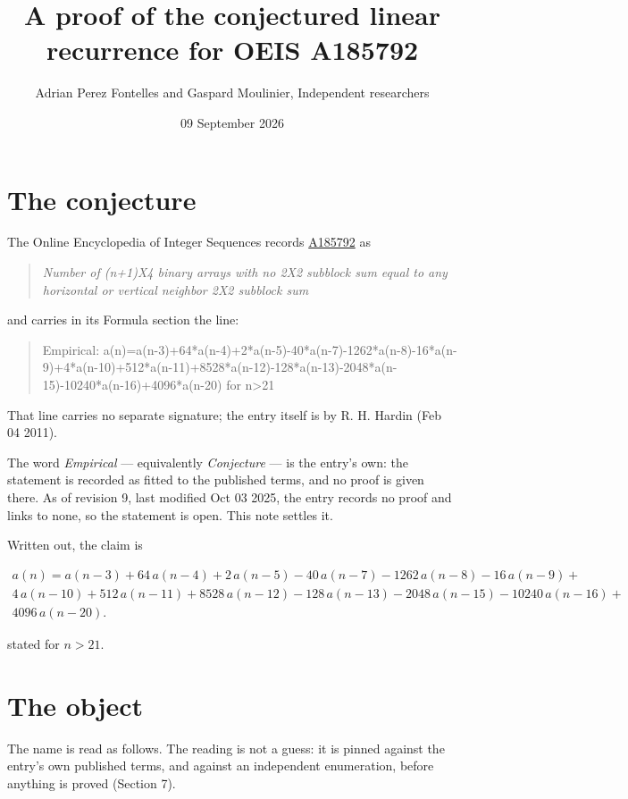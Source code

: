 \documentclass[11pt]{article}
\title{A proof of the conjectured linear recurrence for OEIS A185792}
\author{Adrian Perez Fontelles and Gaspard Moulinier, Independent researchers}
\date{09 September 2026}
\theoremstyle{definition}
\begin{document}
\maketitle
\section{The conjecture}

The Online Encyclopedia of Integer Sequences records \href{https://oeis.org/A185792}{A185792} as

\begin{quote}\itshape Number of (n+1)X4 binary arrays with no 2X2 subblock sum equal to any horizontal or vertical neighbor 2X2 subblock sum\end{quote}

and carries in its Formula section the line:

\begin{quote}\ttfamily Empirical: a(n)=a(n-3)+64*a(n-4)+2*a(n-5)-40*a(n-7)-1262*a(n-8)-16*a(n-9)+4*a(n-10)+512*a(n-11)+8528*a(n-12)-128*a(n-13)-2048*a(n-15)-10240*a(n-16)+4096*a(n-20) for n>21\end{quote}

That line carries no separate signature; the entry itself is by R. H. Hardin (Feb 04 2011).

The word {\itshape Empirical} --- equivalently {\itshape Conjecture} --- is the entry's own: the statement is recorded as fitted to the published terms, and no proof is given there. As of revision 9, last modified Oct 03 2025, the entry records no proof and links to none, so the statement is open. This note settles it.

Written out, the claim is

\begin{multline*} a(n) = a(n-3) + 64\,a(n-4) + 2\,a(n-5) - 40\,a(n-7) - 1262\,a(n-8) - 16\,a(n-9) + \\ 4\,a(n-10) + 512\,a(n-11) + 8528\,a(n-12) - 128\,a(n-13) - 2048\,a(n-15) - 10240\,a(n-16) + \\ 4096\,a(n-20). \end{multline*}

stated for $n > 21$.

\section{The object}

The name is read as follows. The reading is not a guess: it is pinned against the entry's own published terms, and against an independent enumeration, before anything is proved (Section 7).
\end{document}
